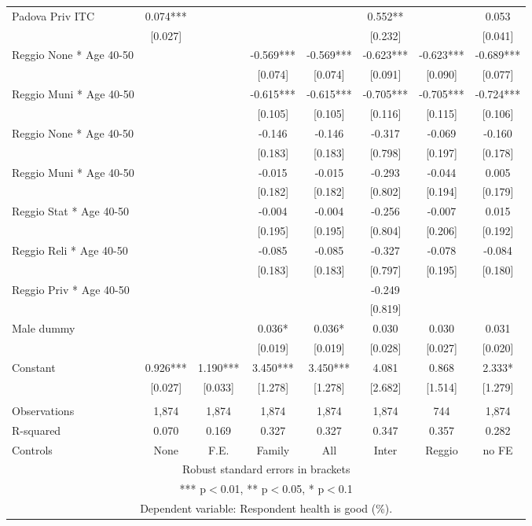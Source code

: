 \begin{tabular}{lccccccc}
Padova Priv ITC & 0.074*** &  &  &  & 0.552** &  & 0.053 \\
 & [0.027] &  &  &  & [0.232] &  & [0.041] \\
Reggio None * Age 40-50 &  &  & -0.569*** & -0.569*** & -0.623*** & -0.623*** & -0.689*** \\
 &  &  & [0.074] & [0.074] & [0.091] & [0.090] & [0.077] \\
Reggio Muni * Age 40-50 &  &  & -0.615*** & -0.615*** & -0.705*** & -0.705*** & -0.724*** \\
 &  &  & [0.105] & [0.105] & [0.116] & [0.115] & [0.106] \\
Reggio None * Age 40-50 &  &  & -0.146 & -0.146 & -0.317 & -0.069 & -0.160 \\
 &  &  & [0.183] & [0.183] & [0.798] & [0.197] & [0.178] \\
Reggio Muni * Age 40-50 &  &  & -0.015 & -0.015 & -0.293 & -0.044 & 0.005 \\
 &  &  & [0.182] & [0.182] & [0.802] & [0.194] & [0.179] \\
Reggio Stat * Age 40-50 &  &  & -0.004 & -0.004 & -0.256 & -0.007 & 0.015 \\
 &  &  & [0.195] & [0.195] & [0.804] & [0.206] & [0.192] \\
Reggio Reli * Age 40-50 &  &  & -0.085 & -0.085 & -0.327 & -0.078 & -0.084 \\
 &  &  & [0.183] & [0.183] & [0.797] & [0.195] & [0.180] \\
Reggio Priv * Age 40-50 &  &  &  &  & -0.249 &  &  \\
 &  &  &  &  & [0.819] &  &  \\
Male dummy &  &  & 0.036* & 0.036* & 0.030 & 0.030 & 0.031 \\
 &  &  & [0.019] & [0.019] & [0.028] & [0.027] & [0.020] \\
Constant & 0.926*** & 1.190*** & 3.450*** & 3.450*** & 4.081 & 0.868 & 2.333* \\
 & [0.027] & [0.033] & [1.278] & [1.278] & [2.682] & [1.514] & [1.279] \\
 &  &  &  &  &  &  &  \\
Observations & 1,874 & 1,874 & 1,874 & 1,874 & 1,874 & 744 & 1,874 \\
R-squared & 0.070 & 0.169 & 0.327 & 0.327 & 0.347 & 0.357 & 0.282 \\
 Controls & None & F.E. & Family & All & Inter & Reggio & no FE \\ \hline
\multicolumn{8}{c}{ Robust standard errors in brackets} \\
\multicolumn{8}{c}{ *** p$<$0.01, ** p$<$0.05, * p$<$0.1} \\
\multicolumn{8}{c}{ Dependent variable: Respondent health is good (\%).} \\
\end{tabular}
